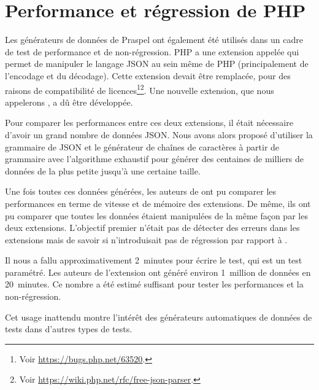 \section{Performance et régression de PHP}
\label{section:experimentation:php}

Les générateurs de données de Praspel ont également été utilisés dans un cadre
de test de performance et de non-régression. PHP a une extension appelée
 qui permet de manipuler le langage JSON au sein même de PHP
(principalement de l'encodage et du décodage). Cette extension devait être
remplacée, pour des raisons de compatibilité de licences\footnote{Voir
\url{https://bugs.php.net/63520}.}\footnote{Voir
\url{https://wiki.php.net/rfc/free-json-parser}.}. Une nouvelle extension, que
nous appelerons , a dû être développée.

Pour comparer les performances entre ces deux extensions, il était nécessaire
d'avoir un grand nombre de données JSON. Nous avons alors proposé d'utiliser la
grammaire de JSON et le générateur de chaînes de caractères à partir de
grammaire avec l'algorithme exhaustif pour générer des centaines de milliers de
données de la plus petite jusqu'à une certaine taille.

Une fois toutes ces données générées, les auteurs de  ont pu
comparer les performances en terme de vitesse et de mémoire des extensions. De
même, ils ont pu comparer que toutes les données étaient manipulées de la même
façon par les deux extensions. L'objectif premier n'était pas de détecter des
erreurs dans les extensions mais de savoir si  n'introduisait
pas de régression par rapport à .

Il nous a fallu approximativement 2~minutes pour écrire le test, qui est un test
paramétré. Les auteurs de l'extension ont généré environ 1~million de données en
20~minutes. Ce nombre a été estimé suffisant pour tester les performances et la
non-régression.

Cet usage inattendu montre l'intérêt des générateurs automatiques de données de
tests dans d'autres types de tests.
